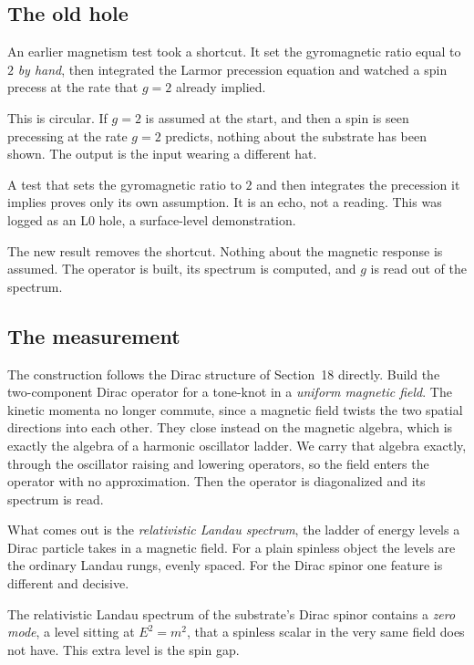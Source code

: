 \subsection{The old hole}

An earlier magnetism test took a shortcut. It set the gyromagnetic ratio equal to $2$ \emph{by hand}, then integrated the Larmor precession equation and watched a spin precess at the rate that $g = 2$ already implied.

This is circular. If $g = 2$ is assumed at the start, and then a spin is seen precessing at the rate $g = 2$ predicts, nothing about the substrate has been shown. The output is the input wearing a different hat.

\begin{principle}
A test that sets the gyromagnetic ratio to $2$ and then integrates the precession it implies proves only its own assumption. It is an echo, not a reading. This was logged as an L0 hole, a surface-level demonstration.
\end{principle}

The new result removes the shortcut. Nothing about the magnetic response is assumed. The operator is built, its spectrum is computed, and $g$ is read out of the spectrum.

\subsection{The measurement}

The construction follows the Dirac structure of Section~18 directly. Build the two-component Dirac operator for a tone-knot in a \emph{uniform magnetic field}. The kinetic momenta no longer commute, since a magnetic field twists the two spatial directions into each other. They close instead on the magnetic algebra, which is exactly the algebra of a harmonic oscillator ladder. We carry that algebra exactly, through the oscillator raising and lowering operators, so the field enters the operator with no approximation. Then the operator is diagonalized and its spectrum is read.

What comes out is the \emph{relativistic Landau spectrum}, the ladder of energy levels a Dirac particle takes in a magnetic field. For a plain spinless object the levels are the ordinary Landau rungs, evenly spaced. For the Dirac spinor one feature is different and decisive.

\begin{result}
The relativistic Landau spectrum of the substrate's Dirac spinor contains a \emph{zero mode}, a level sitting at $E^2 = m^2$, that a spinless scalar in the very same field does not have. This extra level is the spin gap.
\end{result}

